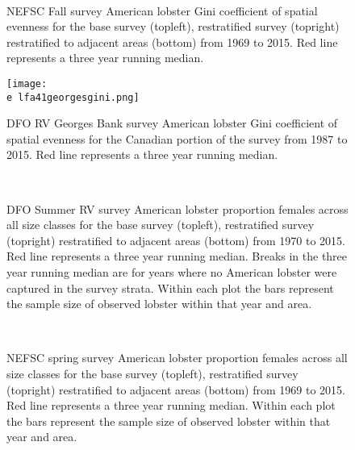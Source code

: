 \documentclass[11pt]{article}
\newcommand{\e}{/backup/bio_data/bio.lobster/figures/} %
\begin{document}
\begin{figure}
\centering
{}
\\
\caption{NEFSC Fall survey American lobster Gini coefficient of spatial evenness for the base survey (topleft), restratified survey (topright) restratified to adjacent areas (bottom) from 1969 to 2015. Red line represents a three year running median.  }
\end{figure}
\clearpage


\begin{figure}

    \texttt{[image: \\e lfa41georgesgini.png]}
    \caption{DFO RV Georges Bank survey American lobster Gini coefficient of spatial evenness for the Canadian portion of the survey from 1987 to 2015. Red line represents a three year running median. }

\end{figure}

\begin{figure}
\centering
{}
\\
\caption{DFO Summer RV survey American lobster proportion females across all size classes for the base survey (topleft), restratified survey (topright) restratified to adjacent areas (bottom) from 1970 to 2015. Red line represents a three year running median. Breaks in the three year running median are for years where no American lobster were captured in the survey strata. Within each plot the bars represent the sample size of observed lobster within that year and area.}
\end{figure}
\clearpage


\begin{figure}
\centering
{}
\\
\caption{NEFSC spring survey American lobster proportion females across all size classes for the base survey (topleft), restratified survey (topright) restratified to adjacent areas (bottom) from 1969 to 2015. Red line represents a three year running median. Within each plot the bars represent the sample size of observed lobster within that year and area. }
\end{figure}
\clearpage
\end{document}
